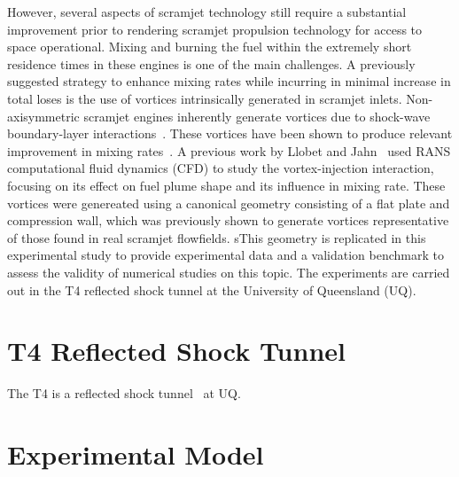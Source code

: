 \documentclass{AIAA}
\begin{document}
However, several aspects of scramjet technology still require a substantial improvement prior to rendering scramjet propulsion technology for access to space operational.
Mixing and burning the fuel within the extremely short residence times in these engines is one of the main challenges.
A previously suggested strategy to enhance mixing rates while incurring in minimal increase in total loses is the use of vortices intrinsically generated in scramjet inlets.
Non-axisymmetric scramjet engines inherently generate vortices due to shock-wave boundary-layer interactions~\cite{Alvi}. 
These vortices have been shown to produce relevant improvement in mixing rates~\cite{SpacePlanes_paper2015,Llobet_PlumeElongation}.
A previous work by Llobet and Jahn~\cite{Llobet_PlumeElongation} used RANS computational fluid dynamics (CFD) to study the vortex-injection interaction, focusing on its effect on fuel plume shape and its influence in mixing rate. 
These vortices were genereated using a canonical geometry consisting of a flat plate and compression wall, which was previously shown to generate vortices representative of those found in real scramjet flowfields.
sThis geometry is replicated in this experimental study to provide experimental data and a validation benchmark to assess the validity of numerical studies on this topic.
The experiments are carried out in the T4 reflected shock tunnel at the University of Queensland (UQ).

\section{T4 Reflected Shock Tunnel}
	\label{sec:T4Literature}
	
The T4 is a reflected shock tunnel~\cite{Stalker1965} at UQ.
%


\section{Experimental Model}
	\label{sec:ModelDescription}
	
\end{document}
